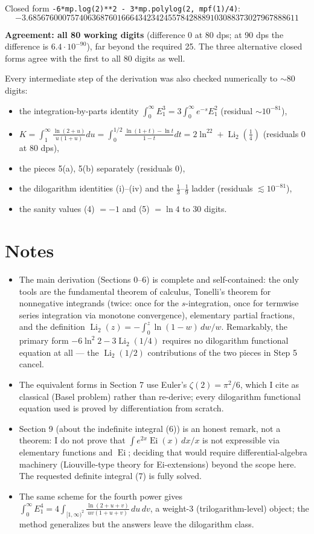 \documentclass[11pt]{article}
\theoremstyle{remark}
\begin{document}
Closed form \texttt{-6*mp.log(2)**2 - 3*mp.polylog(2, mpf(1)/4)}:
{\footnotesize$$-3.6856760007574063687601666434234245578428889103088373027967888611$$}

\textbf{Agreement: all 80 working digits} (difference $0$ at 80 dps; at 90 dps the difference is $6.4\cdot10^{-90}$), far beyond the required 25. The three alternative closed forms agree with the first to all 80 digits as well.

Every intermediate step of the derivation was also checked numerically to $\sim$80 digits:
\begin{itemize}
\item the integration-by-parts identity $\int_0^\infty E_1^3=3\int_0^\infty e^{-s}E_1^2$ (residual $\sim10^{-81}$),
\item $K=\int_1^\infty\frac{\ln(2+u)}{u(1+u)}du=\int_0^{1/2}\frac{\ln(1+t)-\ln t}{1-t}dt=2\ln^22+\operatorname{Li}_2(\tfrac14)$ (residuals $0$ at 80 dps),
\item the pieces 5(a), 5(b) separately (residuals $0$),
\item the dilogarithm identities (i)--(iv) and the $\tfrac13$--$\tfrac19$ ladder (residuals $\lesssim10^{-81}$),
\item the sanity values (4) $=-1$ and (5) $=\ln 4$ to 30 digits.
\end{itemize}

\section*{Notes}

\begin{itemize}
\item The main derivation (Sections 0--6) is complete and self-contained: the only tools are the fundamental theorem of calculus, Tonelli's theorem for nonnegative integrands (twice: once for the $s$-integration, once for termwise series integration via monotone convergence), elementary partial fractions, and the definition $\operatorname{Li}_2(z)=-\int_0^z\ln(1-w)\,dw/w$. Remarkably, the primary form $-6\ln^{2}2-3\operatorname{Li}_{2}(1/4)$ requires no dilogarithm functional equation at all --- the $\operatorname{Li}_2(1/2)$ contributions of the two pieces in Step 5 cancel.
\item The equivalent forms in Section 7 use Euler's $\zeta(2)=\pi^{2}/6$, which I cite as classical (Basel problem) rather than re-derive; every dilogarithm functional equation used is proved by differentiation from scratch.
\item Section 9 (about the indefinite integral (6)) is an honest remark, not a theorem: I do not prove that $\int e^{2x}\operatorname{Ei}(x)\,dx/x$ is not expressible via elementary functions and $\operatorname{Ei}$; deciding that would require differential-algebra machinery (Liouville-type theory for Ei-extensions) beyond the scope here. The requested definite integral (7) is fully solved.
\item The same scheme for the fourth power gives $\int_0^\infty E_1^4=4\int_{[1,\infty)^2}\frac{\ln(2+u+v)}{uv(1+u+v)}\,du\,dv$, a weight-3 (trilogarithm-level) object; the method generalizes but the answers leave the dilogarithm class.
\end{itemize}
\end{document}
